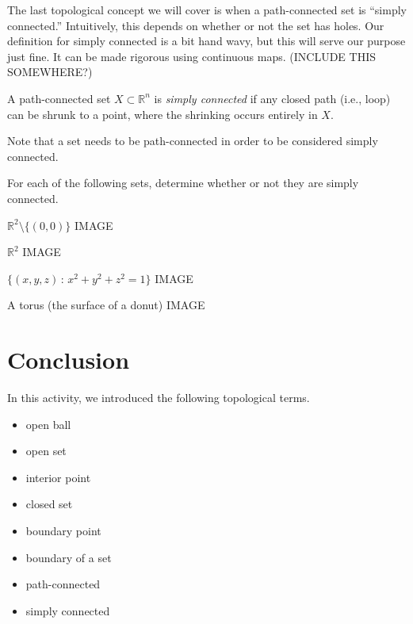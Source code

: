 \documentclass{ximera}
\begin{document}
The last topological concept we will cover is when a path-connected set is ``simply connected.'' Intuitively, this depends on whether or not the set has holes. Our definition for simply connected is a bit hand wavy, but this will serve our purpose just fine. It can be made rigorous using continuous maps. (INCLUDE THIS SOMEWHERE?)

\begin{definition}
A path-connected set $X\subset\mathbb{R}^n$ is \emph{simply connected} if any closed path (i.e., loop) can be shrunk to a point, where the shrinking occurs entirely in $X$.
\end{definition}

Note that a set needs to be path-connected in order to be considered simply connected.

\begin{example}
\begin{foldable}
For each of the following sets, determine whether or not they are simply connected.

$\mathbb{R}^2\setminus\{(0,0)\}$
IMAGE
\begin{multipleChoice}
\end{multipleChoice}

$\mathbb{R}^2$
IMAGE
\begin{multipleChoice}
\end{multipleChoice}

$\{(x,y,z)\,:\,x^2+y^2+z^2=1\}$
IMAGE
\begin{multipleChoice}
\end{multipleChoice}

A torus (the surface of a donut)
IMAGE
\begin{multipleChoice}
\end{multipleChoice}
\end{foldable}
\end{example}

\section{Conclusion}

In this activity, we introduced the following topological terms.
\begin{itemize}
\item open ball
\item open set
\item interior point
\item closed set
\item boundary point
\item boundary of a set
\item path-connected
\item simply connected
\end{itemize}
\end{document}
